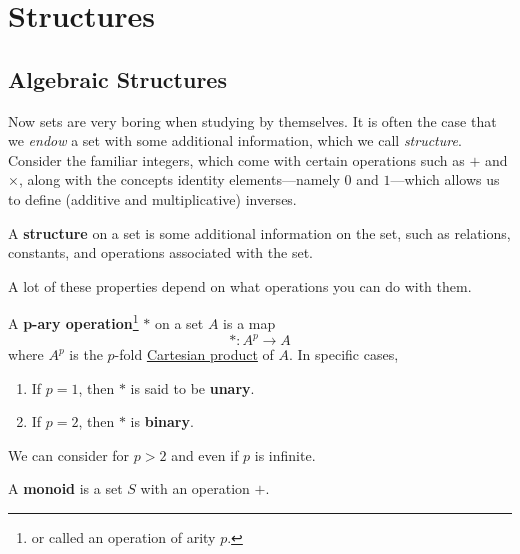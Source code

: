 \section{Structures} 

\subsection{Algebraic Structures}

  Now sets are very boring when studying by themselves. It is often the case that we \textit{endow} a set with some additional information, which we call \textit{structure}. Consider the familiar integers, which come with certain operations such as $+$ and $\times$, along with the concepts identity elements---namely $0$ and $1$---which allows us to define (additive and multiplicative) inverses. 

  \begin{definition}[Structure]
    \label{def:structure}
    A \textbf{structure} on a set is some additional information on the set, such as relations, constants, and operations associated with the set. 
  \end{definition} 

  A lot of these properties depend on what operations you can do with them.  

  \begin{definition}[Operation]
    \label{def:operation}
    A \textbf{p-ary operation}\footnote{or called an operation of arity $p$.} $\ast$ on a set $A$ is a map 
    \begin{equation}
      \ast : A^p \to A
    \end{equation} 
    where $A^p$ is the $p$-fold \hyperref[def:cartesian-product]{Cartesian product} of $A$. In specific cases, 
    \begin{enumerate}
      \item If $p = 1$, then $\ast$ is said to be \textbf{unary}. 
      \item If $p = 2$, then $\ast$ is \textbf{binary}. 
    \end{enumerate}
    We can consider for $p > 2$ and even if $p$ is infinite.  
  \end{definition}

  \begin{definition}[Monoid]
    \label{def:monoid}
    A \textbf{monoid} is a set $S$ with an operation $+$. 
  \end{definition}

  \begin{definition}[Group]
    \label{def:group}
    
  \end{definition}

